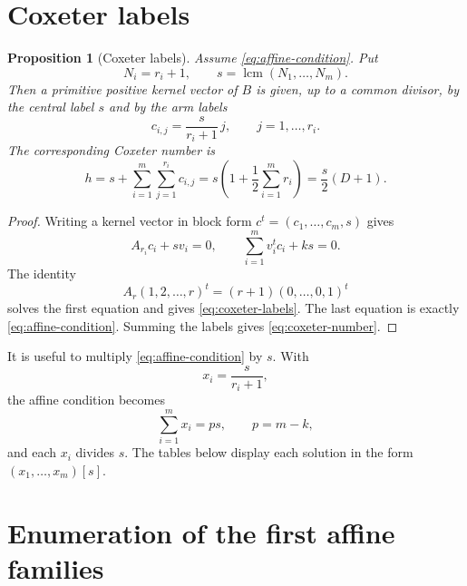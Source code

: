 \documentclass[11pt,a4paper]{article}
\newcommand{\lcm}{\operatorname{lcm}}
\theoremstyle{definition}
\theoremstyle{plain}
\newtheorem{proposition}[definition]{Proposition}
\begin{document}
\section{Coxeter labels}
\label{sec:labels}

\begin{proposition}[Coxeter labels]
Assume \eqref{eq:affine-condition}.  Put
\begin{equation}
N_i=r_i+1,
\qquad s=\lcm(N_1,\ldots,N_m).
\end{equation}
Then a primitive positive kernel vector of $B$ is given, up to a common divisor, by the central label $s$ and by the arm labels
\begin{equation}
 c_{i,j}=\frac{s}{r_i+1}\,j,
 \qquad j=1,\ldots,r_i.
\label{eq:coxeter-labels}
\end{equation}
The corresponding Coxeter number is
\begin{equation}
 h=s+\sum_{i=1}^m\sum_{j=1}^{r_i}c_{i,j}
   =s\left(1+\frac12\sum_{i=1}^m r_i\right)
   =\frac{s}{2}(D+1).
\label{eq:coxeter-number}
\end{equation}
\end{proposition}

\begin{proof}
Writing a kernel vector in block form $c^t=(c_1,\ldots,c_m,s)$ gives
\[
A_{r_i}c_i+s v_i=0,
\qquad
\sum_{i=1}^m v_i^t c_i+k s=0.
\]
The identity
\[
A_r(1,2,\ldots,r)^t=(r+1)(0,\ldots,0,1)^t
\]
solves the first equation and gives \eqref{eq:coxeter-labels}.  The last equation is exactly \eqref{eq:affine-condition}.  Summing the labels gives \eqref{eq:coxeter-number}.
\end{proof}

It is useful to multiply \eqref{eq:affine-condition} by $s$.  With
\begin{equation}
        x_i=\frac{s}{r_i+1},
\end{equation}
the affine condition becomes
\begin{equation}
        \sum_{i=1}^m x_i=p s,
        \qquad p=m-k,
\label{eq:divisor-partition}
\end{equation}
and each $x_i$ divides $s$.  The tables below display each solution in the form $(x_1,\ldots,x_m)[s]$.

\section{Enumeration of the first affine families}
\label{sec:enumeration}
\end{document}

